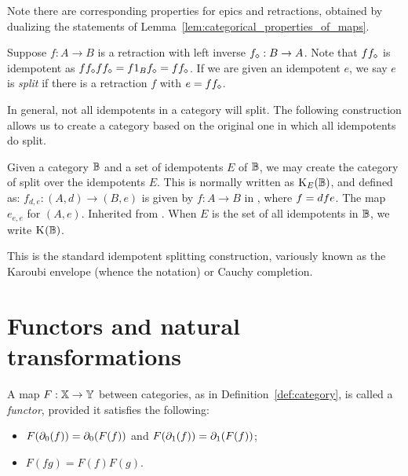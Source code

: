 Note there are corresponding properties for epics and retractions, obtained by dualizing the
statements of Lemma~\ref{lem:categorical_properties_of_maps}.

Suppose $f:A \to B$ is a retraction with left inverse ${f}_\diamond:B \to A$. Note that $f
{f}_\diamond$ is idempotent as $f {f}_\diamond f {f}_\diamond = f 1_B {f}_\diamond = f
{f}_\diamond$. If we are given an idempotent $e$, we say $e$ is \emph{split} if there is a
retraction $f$ with $e = f {f}_\diamond$.

In general, not all idempotents in a category will split. The following construction allows us to
create a category based on the original one in which all idempotents do split.

\begin{definition}\label{def:split_category}
  Given a category $\mathbb{B}$ and a set of idempotents $E$ of $\mathbb{B}$, we may create the category of \B split
  over the idempotents $E$. This is  normally written as $\text{K}_{E}(\mathbb{B})$, and defined as:
    {$f_{d,e}:(A,d)\to(B,e)$ is given by $f:A\to B$ in \B, where $f = d\hspace{0.1pt} f e$.}
    {The map $e_{e,e}$ for $(A,e)$.}
    {Inherited from \B.}
  When $E$ is the set of all idempotents in $\mathbb{B}$, we write $\text{K}_{}(\mathbb{B})$.
\end{definition}
This is the standard idempotent splitting construction, variously known as the Karoubi
envelope (whence the notation) or Cauchy completion.


\section{Functors and natural transformations} %
\label{ssub:functors_and_natural_transformations}

\begin{definition}\label{def:functor}
  A map $F:\mathbb{X} \to \mathbb{Y}$ between categories, as in Definition~\ref{def:category}, is called a
  \emph{functor}, provided it satisfies the following:
  \begin{itemize}
    \item[\axiom{F}{1}] $F(\partial_0({f})) = \partial_0({F(f)})$ and $F(\partial_1({f})) = \partial_1({F(f)})$;
    \item[\axiom{F}{2}] $F(f g) = F(f)F(g)$.
  \end{itemize}
\end{definition}

